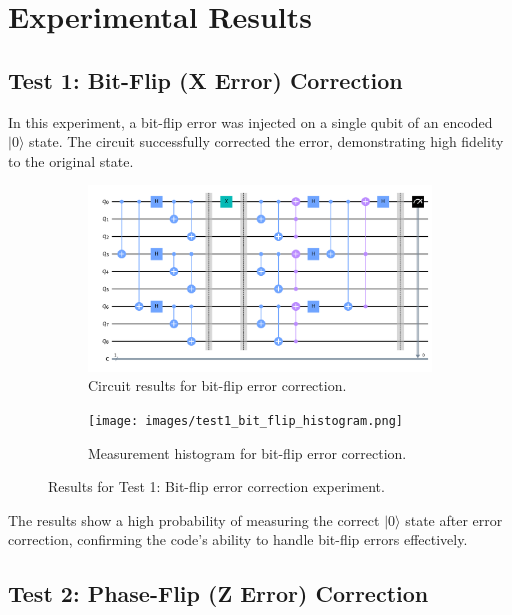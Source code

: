 \documentclass[12pt,a4paper]{article}
\begin{document}
\section{Experimental Results}

\subsection{Test 1: Bit-Flip (X Error) Correction}

In this experiment, a bit-flip error was injected on a single qubit of an encoded $|0\rangle$ state. The circuit successfully corrected the error, demonstrating high fidelity to the original state.

\begin{figure}[H]
    \centering
    \begin{subfigure}[b]{0.49\textwidth}
        \includegraphics[width=\textwidth]{images/test1_bit_flip_correction.png}
        \caption{Circuit results for bit-flip error correction.}
    \end{subfigure}
    \hfill
    \begin{subfigure}[b]{0.49\textwidth}
        \texttt{[image: images/test1\_bit\_flip\_histogram.png]}
        \caption{Measurement histogram for bit-flip error correction.}
    \end{subfigure}
    \caption{Results for Test 1: Bit-flip error correction experiment.}
    \label{fig:bit_flip_results}
\end{figure}

The results show a high probability of measuring the correct $|0\rangle$ state after error correction, confirming the code's ability to handle bit-flip errors effectively.

\subsection{Test 2: Phase-Flip (Z Error) Correction}
\end{document}
